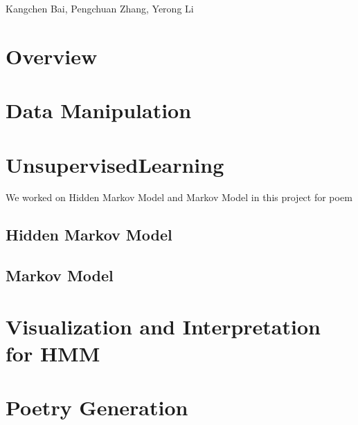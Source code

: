 




\pagestyle{fancy}

\LARGE
\begin{center}

\large
Kangchen Bai, Pengchuan Zhang, Yerong Li
\end{center}

\normalsize
\medskip

\section{Overview}



\section{Data Manipulation}


\section{UnsupervisedLearning}
We worked on Hidden Markov Model and Markov Model in this project for poem

\subsection{Hidden Markov Model}

\subsection{Markov Model}


\section{Visualization and Interpretation for HMM}


\section{Poetry Generation}


